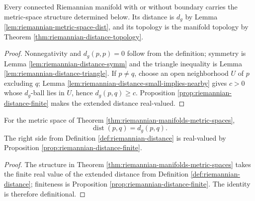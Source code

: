 \begin{theorem}
\label{thm:riemannian-manifolds-metric-spaces}





Every connected Riemannian manifold with or without boundary carries the metric-space structure determined below. Its distance is $d_g$ by Lemma \ref{lem:riemannian-metric-space-dist}, and its topology is the manifold topology by Theorem \ref{thm:riemannian-distance-topology}.
\end{theorem}
\begin{proof}

\sketch Nonnegativity and $d_g(p,p)=0$ follow from the definition; symmetry is Lemma \ref{lem:riemannian-distance-symm} and the triangle inequality is Lemma \ref{lem:riemannian-distance-triangle}. If $p\ne q$, choose an open neighborhood $U$ of $p$ excluding $q$; Lemma \ref{lem:riemannian-distance-small-implies-nearby} gives $c>0$ whose $d_g$-ball lies in $U$, hence $d_g(p,q)\ge c$. Proposition \ref{prop:riemannian-distance-finite} makes the extended distance real-valued.
\end{proof}

\begin{lemma}
\label{lem:riemannian-metric-space-dist}





For the metric space of Theorem \ref{thm:riemannian-manifolds-metric-spaces},
\[
\operatorname{dist}(p,q)=d_g(p,q).
\]
The right side from Definition \ref{def:riemannian-distance} is real-valued by Proposition \ref{prop:riemannian-distance-finite}.
\end{lemma}
\begin{proof}

\sketch The structure in Theorem \ref{thm:riemannian-manifolds-metric-spaces} takes the finite real value of the extended distance from Definition \ref{def:riemannian-distance}; finiteness is Proposition \ref{prop:riemannian-distance-finite}. The identity is therefore definitional.
\end{proof}


